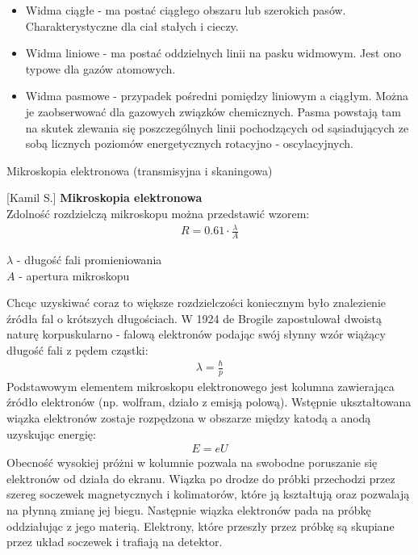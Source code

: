 \documentclass{article}
\begin{document}
\begin{enumerate}
\begin{itemize}
\item Widma ciągłe - ma postać ciągłego obszaru lub szerokich pasów. Charakterystyczne dla ciał stałych i cieczy.
\item Widma liniowe - ma postać oddzielnych linii na pasku widmowym. Jest ono typowe dla gazów atomowych.
\item Widma pasmowe - przypadek pośredni pomiędzy liniowym a ciągłym. Można je zaobserwować dla gazowych związków chemicznych. Pasma powstają tam na skutek zlewania się poszczególnych linii pochodzących od sąsiadujących ze sobą licznych poziomów energetycznych rotacyjno - oscylacyjnych. 
\end{itemize}

{\Large \bf  \item Mikroskopia elektronowa (transmisyjna i skaningowa)} [Kamil S.]
{\bf Mikroskopia elektronowa}\\

Zdolność rozdzielczą mikroskopu można przedstawić wzorem:
\begin{gather*}
R=0.61\cdot \frac{\lambda}{A}
\end{gather*}
\begin{flushright}
\small
$\lambda$ - długość fali promieniowania\\
$ A$ - apertura mikroskopu
\end{flushright}
Chcąc uzyskiwać coraz to większe rozdzielczości koniecznym było znalezienie źródła fal o krótszych długościach. W 1924 de Brogile zapostulował dwoistą naturę korpuskularno - falową elektronów podając swój słynny wzór wiążący długość fali z pędem cząstki:
\begin{gather*}
\lambda=\frac{\hbar}{p}
\end{gather*}
Podstawowym elementem mikroskopu elektronowego jest kolumna zawierająca źródło elektronów (np. wolfram, działo z emisją polową). Wstępnie ukształtowana wiązka elektronów zostaje rozpędzona w obszarze między katodą a anodą uzyskując energię:
\begin{gather*}
E=eU
\end{gather*}
Obecność wysokiej próżni w kolumnie pozwala na swobodne poruszanie się elektronów od działa do ekranu. Wiązka po drodze do próbki przechodzi przez szereg soczewek magnetycznych i kolimatorów, które ją kształtują oraz pozwalają na płynną zmianę jej biegu. Następnie wiązka elektronów pada na próbkę oddziałując z jego materią. Elektrony, które przeszły przez próbkę są skupiane przez układ soczewek i trafiają  na detektor. \\


\end{enumerate}
\end{document}

